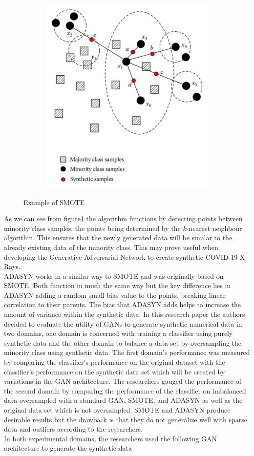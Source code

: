  \begin{figure}[H]
    \centering
    \includegraphics[width=1\textwidth,height=10cm,keepaspectratio]{Images/SMOTE.png}\\
    \caption{Example of SMOTE\cite{litReviewSmote}}
    \label{fig:Example of SMOTE}
\end{figure}
\vspace{0.5mm}
As we can see from figure\ref{fig:Example of SMOTE} the algorithm functions by detecting points between minority class samples, the points being determined by the $k$-nearest neighbour algorithm.  This ensures that the newly generated data will be similar to the already existing data of the minority class.  This may prove useful when developing the Generative Adversarial Network to create synthetic COVID-19 X-Rays.
\\
ADASYN works in a similar way to SMOTE and was originally based on SMOTE.  Both function in much the same way but the key difference lies in ADASYN adding a random small bias value to the points, breaking linear correlation to their parents.  The bias that ADASYN adds helps to increase the amount of variance within the synthetic data.  In this research paper the authors decided to evaluate the utility of GANs to generate synthetic numerical data in two domains, one domain is concerned with training a classifier using purely synthetic data and the other domain to balance a data set by oversampling the minority class using synthetic data.  The first domain's performance was measured by comparing the classifier's performance on the original dataset with the classifier's performance on the synthetic data set which will be created by variations in the GAN architecture.  The researchers gauged the performance of the second domain by comparing the performance of the classifier on imbalanced data oversampled with a standard GAN, SMOTE, and ADASYN as well as the original data set which is not oversampled.  SMOTE and ADASYN produce desirable results but the drawback is that they do not generalize well with sparse data and outliers according to the researchers.
\\
In both experimental domains, the researchers used the following GAN architecture to generate the synthetic data

